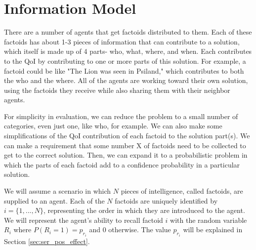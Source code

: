 \section{Information Model}
\label{sec:info_model}

There are a number of agents that get factoids distributed to them.  Each of these factoids has about 1-3 pieces of information that can contribute to a solution, which itself is made up of 4 parts- who, what, where, and when.  Each contributes to the QoI by contributing to one or more parts of this solution.  For example, a factoid could be like "The Lion was seen in Psiland," which contributes to both the who and the where.  All of the agents are working toward their own solution, using the factoids they receive while also sharing them with their neighbor agents.  

For simplicity in evaluation, we can reduce the problem to a small number of categories, even just one, like who, for example.  We can also make some simplifications of the QoI contribution of each factoid to the solution part(s).  We can make a requirement that some number X of factoids need to be collected to get to the correct solution.  Then, we can expand it to a probabilistic problem in which the parts of each factoid add to a confidence probability in a particular solution.

We will assume a scenario in which $N$ pieces of intelligence, called factoids, are supplied to an agent.  Each of the $N$ factoids are uniquely identified by $i = \{1,..., N\}$, representing the order in which they are introduced to the agent.  We will represent the agent's ability to recall factoid $i$ with the random variable $R_i$ where $P(R_i = 1) = p_{r_i}$ and $0$ otherwise.  The value $p_{r_i}$ will be explained in Section \ref{sec:ser_pos_effect}.  

